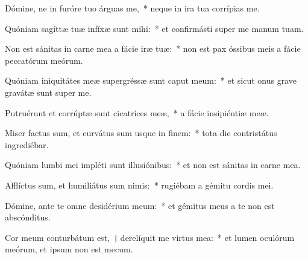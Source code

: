 \item Dómine, ne in furóre tuo árguas me,~* neque in ira tua corrípias me.

\item Quóniam sagíttæ tuæ infíxæ sunt mihi:~* et confirmásti super me manum tuam.

\item Non est sánitas in carne mea a fácie iræ tuæ:~* non est pax óssibus meis a fácie peccatórum meórum.

\item Quóniam iniquitátes meæ supergréssæ sunt caput meum:~* et sicut onus grave gravátæ sunt super me.

\item Putruérunt et corrúptæ sunt cicatríces meæ,~* a fácie insipiéntiæ meæ.

\item Miser factus sum, et curvátus sum usque in finem:~* tota die contristátus ingrediébar.

\item Quóniam lumbi mei impléti sunt illusiónibus:~* et non est sánitas in carne mea.

\item Afflíctus sum, et humiliátus sum nimis:~* rugiébam a gémitu cordis mei.

\item Dómine, ante te omne desidérium meum:~* et gémitus meus a te non est abscónditus.

\item Cor meum conturbátum est,~† derelíquit me virtus mea:~* et lumen oculórum meórum, et ipsum non est mecum.
